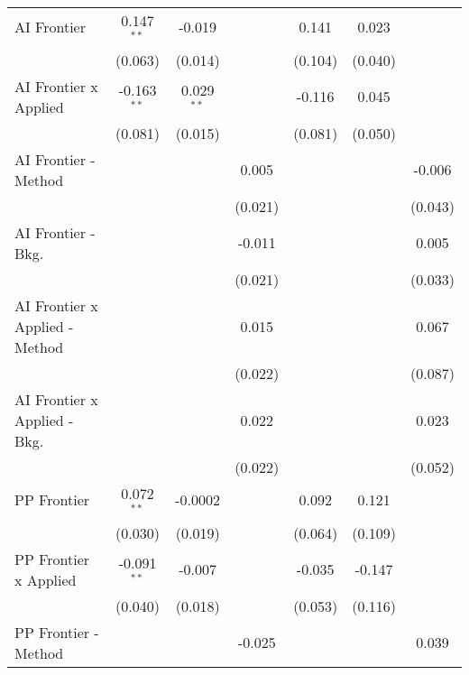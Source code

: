 \begin{tabular}{lcccccc}
   AI Frontier                    & 0.147$^{**}$  & -0.019       &              & 0.141         & 0.023   &   \\   
                                  & (0.063)       & (0.014)      &              & (0.104)       & (0.040) &   \\   
   AI Frontier x Applied          & -0.163$^{**}$ & 0.029$^{**}$ &              & -0.116        & 0.045   &   \\   
                                  & (0.081)       & (0.015)      &              & (0.081)       & (0.050) &   \\   
   AI Frontier - Method           &               &              & 0.005        &               &         & -0.006\\   
                                  &               &              & (0.021)      &               &         & (0.043)\\   
   AI Frontier - Bkg.             &               &              & -0.011       &               &         & 0.005\\   
                                  &               &              & (0.021)      &               &         & (0.033)\\   
   AI Frontier x Applied - Method &               &              & 0.015        &               &         & 0.067\\   
                                  &               &              & (0.022)      &               &         & (0.087)\\   
   AI Frontier x Applied - Bkg.   &               &              & 0.022        &               &         & 0.023\\   
                                  &               &              & (0.022)      &               &         & (0.052)\\   
   PP Frontier                    & 0.072$^{**}$  & -0.0002      &              & 0.092         & 0.121   &   \\   
                                  & (0.030)       & (0.019)      &              & (0.064)       & (0.109) &   \\   
   PP Frontier x Applied          & -0.091$^{**}$ & -0.007       &              & -0.035        & -0.147  &   \\   
                                  & (0.040)       & (0.018)      &              & (0.053)       & (0.116) &   \\   
   PP Frontier - Method           &               &              & -0.025       &               &         & 0.039\\   

\end{tabular}
